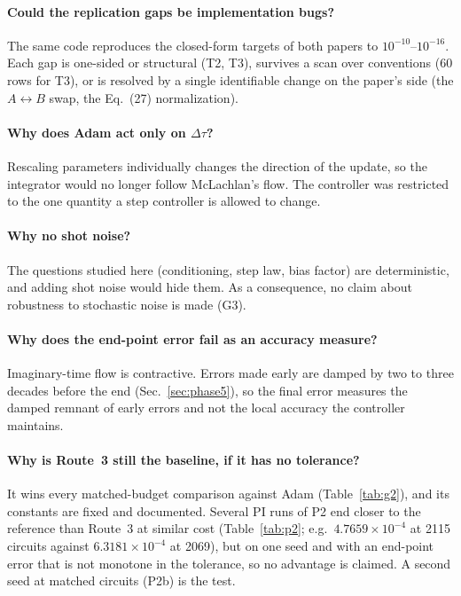 \documentclass[aps,pra,reprint,superscriptaddress,nofootinbib]{revtex4-2}
\newcommand{\dt}{\Delta\tau}
\begin{document}
\paragraph*{Could the replication gaps be implementation bugs?} The same code reproduces
the closed-form targets of both papers to $10^{-10}$--$10^{-16}$. Each gap is one-sided or
structural (T2, T3), survives a scan over conventions (60 rows for T3), or is resolved by a
single identifiable change on the paper's side (the $A\leftrightarrow B$ swap, the Eq.~(27)
normalization).

\paragraph*{Why does Adam act only on $\dt$?} Rescaling parameters individually changes the
direction of the update, so the integrator would no longer follow McLachlan's flow. The
controller was restricted to the one quantity a step controller is allowed to change.

\paragraph*{Why no shot noise?} The questions studied here (conditioning, step law, bias
factor) are deterministic, and adding shot noise would hide them. As a consequence, no claim
about robustness to stochastic noise is made (G3).

\paragraph*{Why does the end-point error fail as an accuracy measure?} Imaginary-time flow is
contractive. Errors made early are damped by two to three decades before the end
(Sec.~\ref{sec:phase5}), so the final error measures the damped remnant of early errors and
not the local accuracy the controller maintains.

\paragraph*{Why is Route~3 still the baseline, if it has no tolerance?} It wins every matched-budget comparison against Adam (Table~\ref{tab:g2}), and its
constants are fixed and documented. Several PI runs of P2 end closer to the reference than Route~3 at similar cost (Table~\ref{tab:p2}; e.g.\ $4.7659\times10^{-4}$ at 2115 circuits against $6.3181\times10^{-4}$ at 2069), but on one seed and with an end-point error that is not monotone in the tolerance, so no advantage is claimed. A second seed at matched circuits (P2b) is the test.
\end{document}
